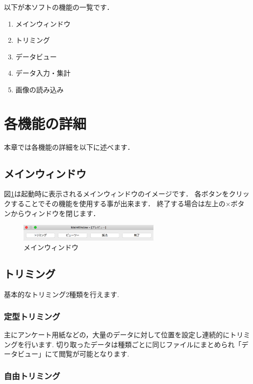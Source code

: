 \documentclass[12pt]{jsreport}
\begin{document}
以下が本ソフトの機能の一覧です．
\begin{enumerate}
    \item メインウィンドウ
    \item トリミング
    \item データビュー
    \item データ入力・集計
    \item 画像の読み込み
\end{enumerate}

\newpage

\section{各機能の詳細}
本章では各機能の詳細を以下に述べます．

\subsection{メインウィンドウ}
図\ref{fig:MainWindow}は起動時に表示されるメインウィンドウのイメージです．
各ボタンをクリックすることでその機能を使用する事が出来ます．
終了する場合は左上の×ボタンからウィンドウを閉じます．
\begin{figure}[htbp]
  \centering
 \begin{minipage}{0.5\hsize}
  \begin{center}
   \includegraphics[width=70mm]{MainWindow.png}
  \end{center}
  \caption{メインウィンドウ}
  \label{fig:MainWindow}
 \end{minipage}
\end{figure}

\subsection{トリミング}
基本的なトリミング2種類を行えます.

\subsubsection{定型トリミング}

    主にアンケート用紙などの，大量のデータに対して位置を設定し連続的にトリミングを行います.
    切り取ったデータは種類ごとに同じファイルにまとめられ「データビュー」にて閲覧が可能となります.

\subsubsection{自由トリミング}
\end{document}
